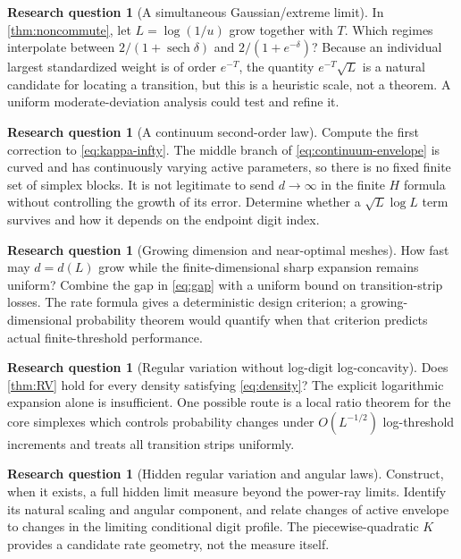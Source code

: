 \documentclass[11pt,a4paper]{article}
\theoremstyle{definition}
\newtheorem{question}[theorem]{Research question}
\theoremstyle{remark}
\newcommand{\sech}{\operatorname{sech}}
\numberwithin{equation}{section}
\begin{document}
\begin{question}[A simultaneous Gaussian/extreme limit]
In \cref{thm:noncommute}, let $L=\log(1/u)$ grow together with $T$.
Which regimes interpolate between $2/(1+\sech\delta)$ and
$2/(1+e^{-\delta})$? Because an individual largest standardized weight is
of order $e^{-T}$, the quantity $e^{-T}\sqrt L$ is a natural candidate
for locating a transition, but this is a heuristic scale, not a theorem.
A uniform moderate-deviation analysis could test and refine it.
\end{question}

\begin{question}[A continuum second-order law]
Compute the first correction to \eqref{eq:kappa-infty}. The middle
branch of \eqref{eq:continuum-envelope} is curved and has continuously
varying active parameters, so there is no fixed finite set of simplex
blocks. It is not legitimate to send $d\to\infty$ in the finite $H$
formula without controlling the growth of its error. Determine whether a
$\sqrt L\log L$ term survives and how it depends on the endpoint digit
index.
\end{question}

\begin{question}[Growing dimension and near-optimal meshes]
How fast may $d=d(L)$ grow while the finite-dimensional sharp expansion
remains uniform? Combine the gap in \eqref{eq:gap} with a uniform bound
on transition-strip losses. The rate formula gives a deterministic design
criterion; a growing-dimensional probability theorem would quantify when
that criterion predicts actual finite-threshold performance.
\end{question}

\begin{question}[Regular variation without log-digit log-concavity]
Does \cref{thm:RV} hold for every density satisfying
\eqref{eq:density}? The explicit logarithmic expansion alone is
insufficient. One possible route is a local ratio theorem for the core
simplexes which controls probability changes under $O(L^{-1/2})$
log-threshold increments and treats all transition strips uniformly.
\end{question}

\begin{question}[Hidden regular variation and angular laws]
Construct, when it exists, a full hidden limit measure beyond the power-ray
limits. Identify its natural scaling and angular component, and relate
changes of active envelope to changes in the limiting conditional digit
profile. The piecewise-quadratic $K$ provides a candidate rate geometry,
not the measure itself.
\end{question}
\end{document}
